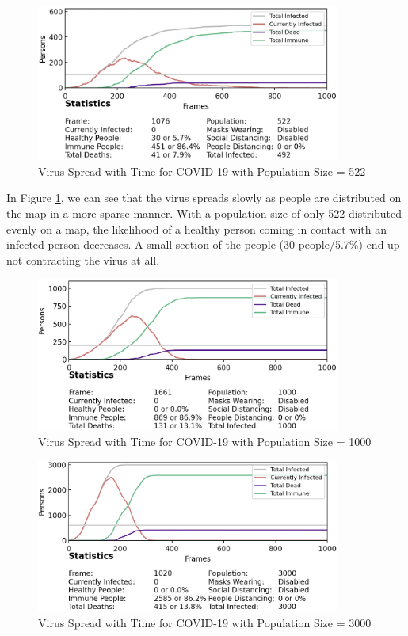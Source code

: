 \documentclass[11pt]{article}
\begin{document}
 \begin{figure}[H]
    \centering
    \includegraphics[width=10cm]{figures/population_denisty_522.png}
    \caption{Virus Spread with Time for COVID-19 with Population Size = 522}
    \label{population_denisty_522}
\end{figure}

In Figure \ref{population_denisty_522}, we can see that the virus spreads slowly as people are distributed on the map in a more sparse manner. With a population size of only 522 distributed evenly on a map, the likelihood of a healthy person coming in contact with an infected person decreases. A small section of the people (30 people/5.7\%) end up not contracting the virus at all. 

\begin{figure}[H]
    \centering
    \includegraphics[width=10cm]{figures/population_density_1000.png}
    \caption{Virus Spread with Time for COVID-19 with Population Size = 1000}
    \label{population_density_1000}
\end{figure}

\begin{figure}[H]
    \centering
    \includegraphics[width=10cm]{figures/population_density_3000.png}
    \caption{Virus Spread with Time for COVID-19 with Population Size = 3000}
    \label{population_density_3000}
\end{figure}
\end{document}
